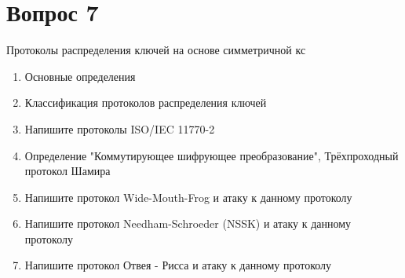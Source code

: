 \documentclass[a4paper,12pt]{article}
\begin{document}
	\section{Вопрос 7}
	Протоколы распределения ключей на основе симметричной кс
	\begin{enumerate}
		\item Основные определения
		\item Классификация протоколов распределения ключей
		\item Напишите протоколы ISO/IEC 11770-2
		\item Определение "Коммутирующее шифрующее преобразование", Трёхпроходный протокол Шамира
		\item Напишите протокол Wide-Mouth-Frog и атаку к данному протоколу
		\item Напишите протокол Needham-Schroeder (NSSK) и атаку к данному протоколу
		\item Напишите протокол Отвея - Рисса и атаку к данному протоколу
	\end{enumerate}
	\newpage

	
	
\end{document}

